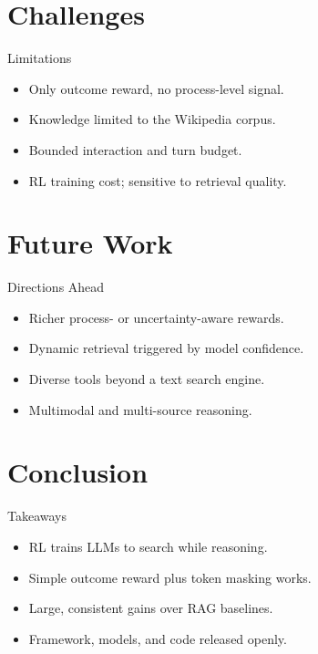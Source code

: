 \documentclass{beamer}
\begin{document}
\section{Challenges}
\begin{frame}{Limitations}
\begin{itemize}
\item Only outcome reward, no process-level signal.
\item Knowledge limited to the Wikipedia corpus.
\item Bounded interaction and turn budget.
\item RL training cost; sensitive to retrieval quality.
\end{itemize}
\end{frame}

\section{Future Work}
\begin{frame}{Directions Ahead}
\begin{itemize}
\item Richer process- or uncertainty-aware rewards.
\item Dynamic retrieval triggered by model confidence.
\item Diverse tools beyond a text search engine.
\item Multimodal and multi-source reasoning.
\end{itemize}
\end{frame}

\section{Conclusion}
\begin{frame}{Takeaways}
\begin{itemize}
\item RL trains LLMs to search while reasoning.
\item Simple outcome reward plus token masking works.
\item Large, consistent gains over RAG baselines.
\item Framework, models, and code released openly.
\end{itemize}
\end{frame}
\end{document}
